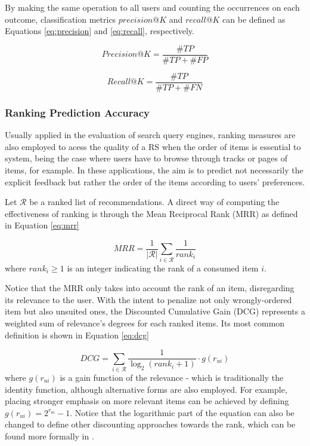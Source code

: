 By making the same operation to all users and counting the occurrences on each outcome, classification metrics $precision@K$ and $recall@K$ can be defined as Equations \ref{eq:precision} and \ref{eq:recall}, respectively.

\begin{equation}
\label{eq:precision}
Precision@K = \frac{\#TP}{\#TP + \#FP}
\end{equation}

\begin{equation}
\label{eq:recall}
Recall@K = \frac{\#TP}{\#TP + \#FN}
\end{equation}

\subsubsection{Ranking Prediction Accuracy}

Usually applied in the evaluation of search query engines, ranking measures are also employed to acess the quality of a RS when the order of items is essential to system, being the case where users have to browse through tracks or pages of items, for example. In these applications, the aim is to predict not necessarily the explicit feedback but rather the order of the items according to users' preferences. 

Let $\mathcal{R}$ be a ranked list of recommendations. A direct way of computing the effectiveness of ranking is through the Mean Reciprocal Rank (MRR)  as defined in Equation \ref{eq:mrr}

\begin{equation}
\label{eq:mrr}
MRR = \frac{1}{|\mathcal{R}|}\sum_{i \in \mathcal{R}} \frac{1}{rank_i}
\end{equation} where $rank_i \geq 1$ is an integer indicating the rank of a consumed item $i$. 

Notice that the MRR only takes into account the rank of an item, disregarding its relevance to the user. With the intent to penalize not only wrongly-ordered item but also unsuited ones, the Discounted Cumulative Gain (DCG)  \cite{10.1145/582415.582418} represents a weighted sum of relevance's degrees for each ranked items. Its most common definition is shown in Equation \ref{eq:dcg}

\begin{equation}
    \label{eq:dcg}
    DCG = \sum_{i \in \mathcal{R}} \frac{1}{\log_2(rank_i+1)} \cdot g(r_{ui})
\end{equation} where $g(r_{ui})$ is a gain function of the relevance - which is traditionally the identity function, although alternative forms are also employed. For example, placing stronger emphasis on more relevant items can be achieved by defining $g(r_{ui}) = 2^{r_{ui}}-1$. Notice that the logarithmic part of the equation can also be changed to define other discounting approaches towards the rank, which can be found more formally in \cite{NDCGref}.


